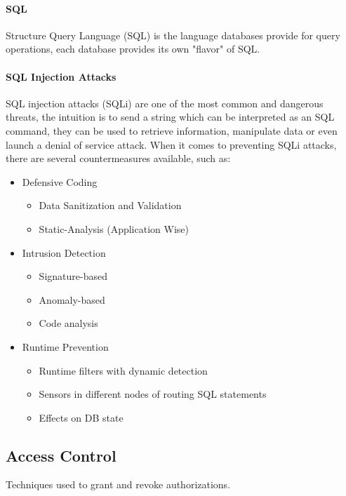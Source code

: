 \paragraph{SQL}
Structure Query Language (SQL) is the language databases provide for query operations,
each database provides its own "flavor" of SQL.

\paragraph{SQL Injection Attacks}
SQL injection attacks (SQLi) are one of the most common and dangerous threats,
the intuition is to send a string which can be interpreted as an SQL command,
they can be used to retrieve information, manipulate data or even launch a denial of service attack.
When it comes to preventing SQLi attacks, there are several countermeasures available,
such as:
\begin{itemize}
    \item Defensive Coding
          \begin{itemize}
              \item Data Sanitization and Validation
              \item Static-Analysis (Application Wise)
          \end{itemize}
    \item Intrusion Detection
          \begin{itemize}
              \item Signature-based
              \item Anomaly-based
              \item Code analysis
          \end{itemize}
    \item Runtime Prevention
          \begin{itemize}
              \item Runtime filters with dynamic detection
              \item Sensors in different nodes of routing SQL statements
              \item Effects on DB state
          \end{itemize}
\end{itemize}

\subsection{Access Control}
Techniques used to grant and revoke authorizations.

